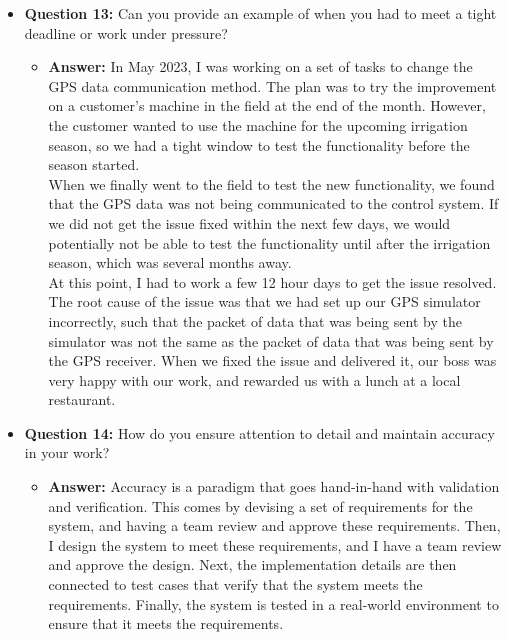 \documentclass{article}
\begin{document}
\begin{itemize}
    \item \textbf{Question 13:} Can you provide an example of when you had to meet a tight deadline or work under pressure?
    \begin{itemize}
        \item \textbf{Answer:} In May 2023, I was working on a set of tasks to change the GPS
        data communication method. The plan was to try
        the improvement on a customer's machine in the field at the end of the month.
        However, the customer wanted to use
        the machine for the upcoming irrigation season, so we had a tight window
        to test the functionality before the season started.\\

        When we finally went to the field to test the new functionality, we
        found that the GPS data was not being communicated to the control system.
        If we did not get the issue fixed within the next few days, we would potentially
        not be able to test the functionality until after the irrigation season, which
        was several months away.\\

        At this point, I had to work a few 12 hour days to get the issue resolved. The root
        cause of the issue was that we had set up our GPS simulator incorrectly, such that
        the packet of data that was being sent by the simulator was not the same as the
        packet of data that was being sent by the GPS receiver. When we fixed the issue and
        delivered it, our boss was very happy with our work, and rewarded us with a
        lunch at a local restaurant.
    \end{itemize}
    
    \item \textbf{Question 14:} How do you ensure attention to detail and maintain accuracy in your work?
    \begin{itemize}
        \item \textbf{Answer:} Accuracy is a paradigm that goes hand-in-hand with
        validation and verification. This comes by devising a set of requirements
        for the system, and having a team review and approve these requirements.
        Then, I design the system to meet these requirements, and I have a team
        review and approve the design. Next, the implementation details are then
        connected to test cases that verify that the system meets the requirements.
        Finally, the system is tested in a real-world environment to ensure that it
        meets the requirements.\\


\end{itemize}
\end{itemize}
\end{document}
